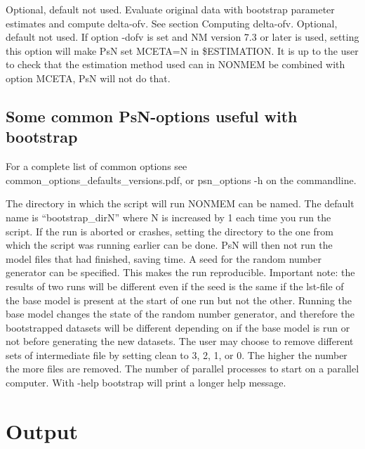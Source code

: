 \begin{optionlist}
\nextopt
{}
Optional, default not used. Evaluate original data with bootstrap parameter estimates and compute delta-ofv. See section Computing delta-ofv. 
\nextopt
{}
Optional, default not used. If option -dofv is set and NM version 7.3 or later is used, setting this option will make PsN set MCETA=N in \$ESTIMATION. It is up to the user to check that the estimation method used can in NONMEM be combined with option MCETA, PsN will not do that. 
\nextopt
\end{optionlist}


\subsection{Some common PsN-options useful with bootstrap}

For a complete list of common options see common\_options\_defaults\_versions.pdf, or psn\_options -h on the commandline.

\begin{optionlist}
The directory in which the script will run NONMEM can be named. The default name is “bootstrap\_dirN” where N is increased by 1 each time you run the script. If the run is aborted or crashes, setting the directory to the one from which the script was running earlier can be done. PsN will then not run the model files that had finished, saving time. 
\nextopt
{}
A seed for the random number generator can be specified. This makes the run reproducible. Important note: the results of two runs will be different even if the seed is the same if the lst-file of the base model is present at the start of one run but not the other. Running the base model changes the state of the random number generator, and therefore the bootstrapped datasets will be different depending on if the base model is run or not before generating the  new datasets. 
\nextopt
{}
The user may choose to remove different sets of intermediate file by setting clean to 3, 2, 1, or 0. The higher the number the more files are removed. 
\nextopt
{}
The number of parallel processes to start on a parallel computer. 
\nextopt
{}
With -help bootstrap will print a longer help message. 
\nextopt
\end{optionlist}


\section{Output}

